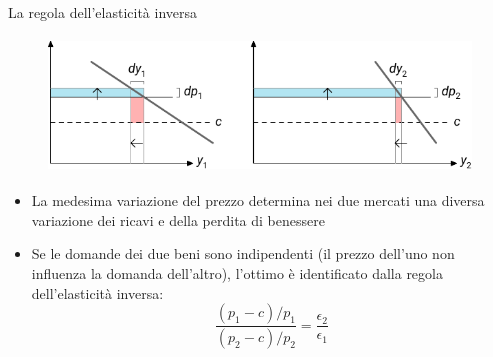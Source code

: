 \documentclass[aspectratio=149,11pt]{beamer}
\begin{document}
\begin{frame}{La regola dell'elasticità inversa}
\begin{figure}[htbp]
\centering
\includegraphics[height=3.6cm]{./figure/ramsey-3-color.pdf}
\end{figure}

\begin{itemize}
\item La medesima variazione del prezzo determina nei due mercati una diversa variazione dei ricavi e
della perdita di benessere
\item Se le domande dei due beni sono indipendenti (il prezzo dell'uno non influenza la domanda dell'altro), l'ottimo è identificato dalla regola
dell'elasticità inversa:
\begin{equation*}
\frac{(p_1-c)/p_1}{(p_2-c)/p_2}=\frac{\epsilon_2}{\epsilon_1}
\end{equation*}
\end{itemize}
\end{frame}
\end{document}
